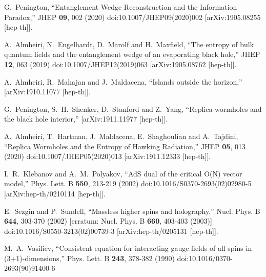 \documentclass[a4paper,12pt]{article}
\begin{document}
\begin{thebibliography}{}
G.~Penington,
``Entanglement Wedge Reconstruction and the Information Paradox,''
JHEP \textbf{09}, 002 (2020)
doi:10.1007/JHEP09(2020)002
[arXiv:1905.08255 [hep-th]].

A.~Almheiri, N.~Engelhardt, D.~Marolf and H.~Maxfield,
``The entropy of bulk quantum fields and the entanglement wedge of an evaporating black hole,''
JHEP \textbf{12}, 063 (2019)
doi:10.1007/JHEP12(2019)063
[arXiv:1905.08762 [hep-th]].

A.~Almheiri, R.~Mahajan and J.~Maldacena,
``Islands outside the horizon,''
[arXiv:1910.11077 [hep-th]].

G.~Penington, S.~H.~Shenker, D.~Stanford and Z.~Yang,
``Replica wormholes and the black hole interior,''
[arXiv:1911.11977 [hep-th]].

A.~Almheiri, T.~Hartman, J.~Maldacena, E.~Shaghoulian and A.~Tajdini,
``Replica Wormholes and the Entropy of Hawking Radiation,''
JHEP \textbf{05}, 013 (2020)
doi:10.1007/JHEP05(2020)013
[arXiv:1911.12333 [hep-th]].

I.~R.~Klebanov and A.~M.~Polyakov,
``AdS dual of the critical O(N) vector model,''
Phys. Lett. B \textbf{550}, 213-219 (2002)
doi:10.1016/S0370-2693(02)02980-5
[arXiv:hep-th/0210114 [hep-th]].

E.~Sezgin and P.~Sundell,
``Massless higher spins and holography,''
Nucl. Phys. B \textbf{644}, 303-370 (2002)
[erratum: Nucl. Phys. B \textbf{660}, 403-403 (2003)]
doi:10.1016/S0550-3213(02)00739-3
[arXiv:hep-th/0205131 [hep-th]].

M.~A.~Vasiliev,
``Consistent equation for interacting gauge fields of all spins in (3+1)-dimensions,''
Phys. Lett. B \textbf{243}, 378-382 (1990)
doi:10.1016/0370-2693(90)91400-6


\end{thebibliography}
\end{document}
